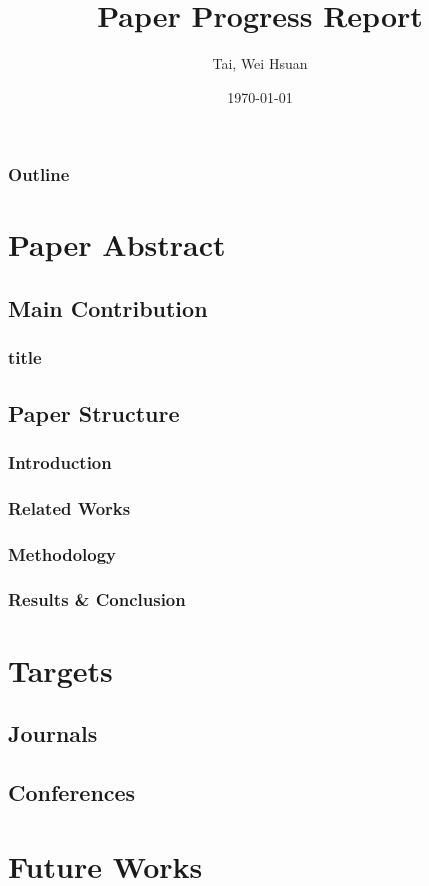 \documentclass[xcolor=dvipsnames]{beamer}
\title{Paper Progress Report}
\author{Tai, Wei Hsuan}
\date{\today}
\begin{document}
	\begin{frame}
		\titlepage
	\end{frame}


    \begin{frame}
        \frametitle{Outline}
        \tableofcontents
    \end{frame}
    

    \section{Paper Abstract}

    \subsection{Main Contribution}
    \begin{frame}
        \frametitle{title}
    \end{frame}
    \subsection{Paper Structure}
    \begin{frame}
        \frametitle{Introduction}
        
    \end{frame}
    \begin{frame}
        \frametitle{Related Works}
        
    \end{frame}

    \begin{frame}
        \frametitle{Methodology}
        
    \end{frame}

    \begin{frame}
        \frametitle{Results \& Conclusion}
    \end{frame}

    \section{Targets}
    \subsection{Journals}
    \subsection{Conferences}
    \section{Future Works}
\end{document}
